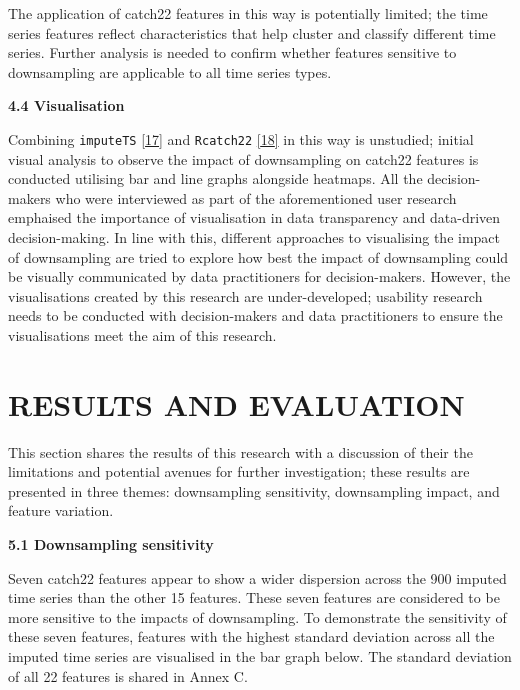 \documentclass{article}
\begin{document}
The application of catch22 features in this way is potentially limited;
the time series features reflect characteristics that help cluster and
classify different time series. Further analysis is needed to confirm
whether features sensitive to downsampling are applicable to all time
series types.

\textbf{4.4 Visualisation}

Combining \texttt{imputeTS} \protect\hyperlink{ref-imputeTS_R}{{[}17{]}}
and \texttt{Rcatch22} \protect\hyperlink{ref-catch22_R}{{[}18{]}} in
this way is unstudied; initial visual analysis to observe the impact of
downsampling on catch22 features is conducted utilising bar and line
graphs alongside heatmaps. All the decision-makers who were interviewed
as part of the aforementioned user research emphaised the importance of
visualisation in data transparency and data-driven decision-making. In
line with this, different approaches to visualising the impact of
downsampling are tried to explore how best the impact of downsampling
could be visually communicated by data practitioners for
decision-makers. However, the visualisations created by this research
are under-developed; usability research needs to be conducted with
decision-makers and data practitioners to ensure the visualisations meet
the aim of this research.

\hypertarget{results-and-evaluation}{%
\section{RESULTS AND EVALUATION}\label{results-and-evaluation}}

\vspace{-0.4cm}

This section shares the results of this research with a discussion of
their the limitations and potential avenues for further investigation;
these results are presented in three themes: downsampling sensitivity,
downsampling impact, and feature variation.

\textbf{5.1 Downsampling sensitivity}

Seven catch22 features appear to show a wider dispersion across the 900
imputed time series than the other 15 features. These seven features are
considered to be more sensitive to the impacts of downsampling. To
demonstrate the sensitivity of these seven features, features with the
highest standard deviation across all the imputed time series are
visualised in the bar graph below. The standard deviation of all 22
features is shared in Annex C.
\end{document}
